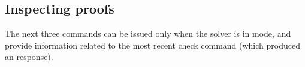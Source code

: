 \subsection{Inspecting proofs} 

The next three commands can be issued only when the solver is 
in  mode, and provide information related to the most recent 
check command (which produced an  response).

